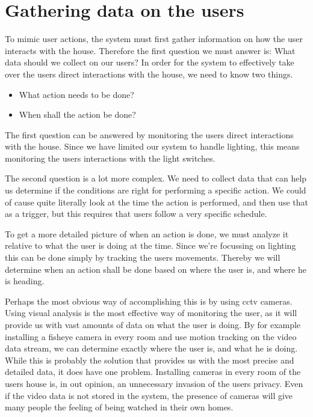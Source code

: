 \section{Gathering data on the users}
\label{gatheringdataontheusers}

To mimic user actions, the system must first gather information on how the user interacts with the house. Therefore the first question we must answer is: What data should we collect on our users? In order for the system to effectively take over the users direct interactions with the house, we need to know two things. 

\begin{itemize}
\item What action needs to be done?

\item When shall the action be done?

\end{itemize}

The first question can be answered by monitoring the users direct interactions with the house. Since we have limited our system to handle lighting, this means monitoring the users interactions with the light switches.

The second question is a lot more complex. We need to collect data that can help us determine if the conditions are right for performing a specific action. We could of cause quite literally look at the time the action is performed, and then use that as a trigger, but this requires that users follow a very specific schedule.

To get a more detailed picture of when an action is done, we must analyze it relative to what the user is doing at the time. Since we're focussing on lighting this can be done simply by tracking the users movements. Thereby we will determine when an action shall be done based on where the user is, and where he is heading.

Perhaps the most obvious way of accomplishing this is by using cctv cameras. Using visual analysis is the most effective way of monitoring the user, as it will provide us with vast amounts of data on what the user is doing. By for example installing a fisheye camera in every room and use motion tracking on the video data stream, we can determine exactly where the user is, and what he is doing. While this is probably the solution that provides us with the most precise and detailed data, it does have one problem. Installing cameras in every room of the users house is, in out opinion, an unnecessary invasion of the users privacy. Even if the video data is not stored in the system, the presence of cameras will give many people the feeling of being watched in their own homes. 

